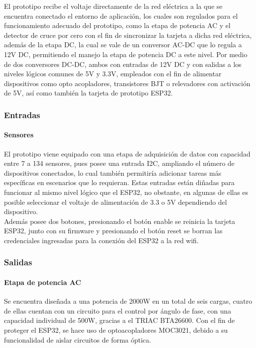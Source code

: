 	El prototipo recibe el voltaje directamente de la red eléctrica a la que se encuentra conectado el entorno de aplicación, los cuales son regulados para el funcionamiento adecuado del prototipo, como la etapa de potencia AC y el detector de cruce por cero con el fin de sincronizar la tarjeta a dicha red eléctrica, además de la etapa DC, la cual se vale de un conversor AC-DC que lo regula a 12V DC, permitiendo el manejo la etapa de potencia DC a este nivel.  Por medio de dos conversores DC-DC, ambos con entradas de 12V DC y con salidas a los niveles lógicos comunes de 5V y 3.3V, empleados con el fin de alimentar dispositivos como opto acopladores, transistores BJT o relevadores con activación de 5V, así como también la tarjeta de prototipo ESP32.\\
			
	\subsubsection{Entradas}
	\paragraph{Sensores}
		El prototipo viene equipado con una etapa de adquisición de datos con capacidad entre 7 a 134 sensores, pues posee una entrada I2C, ampliando el número de dispositivos conectados, lo cual también permitiría adicionar tareas más específicas en escenarios que lo requieran. Estas entradas están diñadas para funcionar al mismo nivel lógico que el ESP32, no obstante, en algunas de ellas es posible seleccionar el voltaje de alimentación de 3.3 o 5V dependiendo del dispositivo.\\
		
		Además posee dos botones, presionando el botón enable se reinicia la tarjeta ESP32, junto con su firmware y presionando el botón reset se borran las credenciales ingresadas para la conexión del ESP32 a la red wifi.\\
	
		
	\subsubsection{Salidas}
	\paragraph{Etapa de potencia AC}
		Se encuentra diseñada a una potencia de 2000W en un total de seis cargas, cuatro de ellas cuentan con un circuito para el control por ángulo de fase, con una capacidad individual de 500W, gracias a el TRIAC BTA26600. Con el fin de proteger el ESP32, se hace uso de optoacopladores MOC3021, debido a su funcionalidad de aislar circuitos de forma óptica.\\
	

